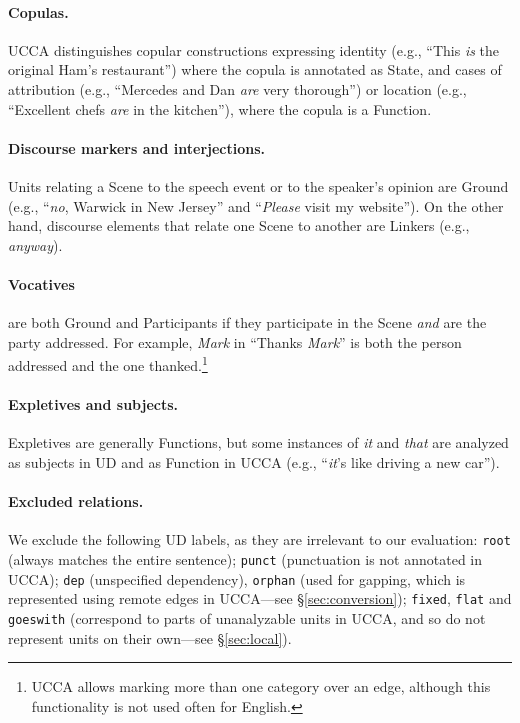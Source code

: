 \documentclass[11pt,a4paper]{article}
\begin{document}
\paragraph{Copulas.}
    UCCA distinguishes copular constructions expressing
    identity (e.g., ``This \textit{is} the original Ham's restaurant'') where the copula is annotated as State,
    and cases of attribution 
    (e.g., ``Mercedes and Dan \textit{are} very thorough'')
    or location (e.g., ``Excellent chefs \textit{are} in the kitchen''),
    where the copula is a Function.

\paragraph{Discourse markers and interjections.}
    Units relating a Scene to the speech event or to the speaker's opinion are Ground
    (e.g., ``\textit{no}, Warwick in New Jersey'' and ``\textit{Please} visit my website'').
    On the other hand, discourse elements that relate one Scene to another 
    are Linkers (e.g., \textit{anyway}).

\paragraph{Vocatives}
    are both Ground and Participants if they participate in the Scene \textit{and} are the party addressed.
    For example, \textit{Mark} in ``Thanks \textit{Mark}'' is both the person addressed and the one thanked.\footnote{UCCA allows marking more than one category over an edge, although this
    functionality is not used often for English.}
    
\paragraph{Expletives and subjects.}
    Expletives are generally Functions,
    but some instances of \textit{it} and \textit{that} are analyzed as subjects in UD
    and as Function in UCCA (e.g., ``\textit{it}'s like driving a new car'').

\paragraph{Excluded relations.}
We exclude the following UD labels,
as they are irrelevant to our evaluation:
\texttt{root} (always matches the entire sentence);
\texttt{punct} (punctuation is not annotated in UCCA);
\texttt{dep} (unspecified dependency),
\texttt{orphan} (used for gapping, which is represented using remote edges in UCCA---see \S\ref{sec:conversion});
\texttt{fixed}, \texttt{flat} and \texttt{goeswith} (correspond to parts of unanalyzable units in UCCA,
    and so do not represent units on their own---see \S\ref{sec:local}).
\end{document}
